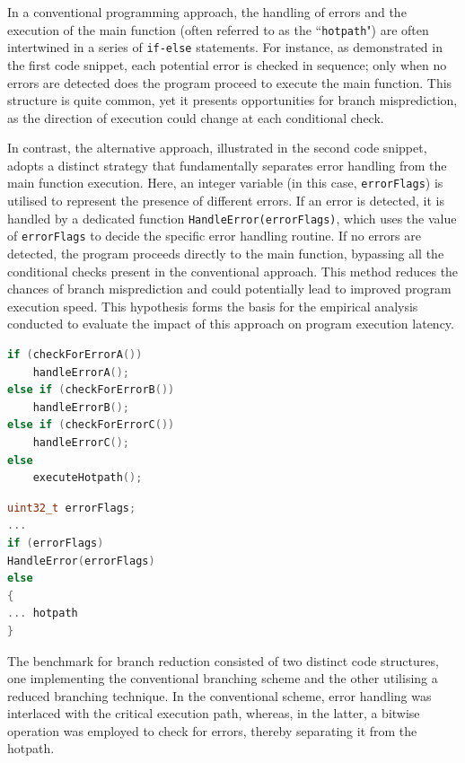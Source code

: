 \documentclass{article}
\theoremstyle{break}
\begin{document}
In a conventional programming approach, the handling of errors and the execution of the main function (often referred to as the ``\texttt{hotpath}") are often intertwined in a series of \texttt{if-else} statements. For instance, as demonstrated in the first code snippet, each potential error is checked in sequence; only when no errors are detected does the program proceed to execute the main function. This structure is quite common, yet it presents opportunities for branch misprediction, as the direction of execution could change at each conditional check.

In contrast, the alternative approach, illustrated in the second code snippet, adopts a distinct strategy that fundamentally separates error handling from the main function execution. Here, an integer variable (in this case, \texttt{errorFlags}) is utilised to represent the presence of different errors. If an error is detected, it is handled by a dedicated function \texttt{HandleError(errorFlags)}, which uses the value of \texttt{errorFlags} to decide the specific error handling routine. If no errors are detected, the program proceeds directly to the main function, bypassing all the conditional checks present in the conventional approach. This method reduces the chances of branch misprediction and could potentially lead to improved program execution speed. This hypothesis forms the basis for the empirical analysis conducted to evaluate the impact of this approach on program execution latency.



\begin{minipage}{.45\textwidth}
    \begin{lstlisting}[language=C++, title=Snippet 1: Bad design]
if (checkForErrorA())
    handleErrorA();
else if (checkForErrorB())
    handleErrorB();
else if (checkForErrorC())
    handleErrorC();
else
    executeHotpath();
    \end{lstlisting}
  \end{minipage}\hfill%
  \begin{minipage}{.45\textwidth}
    \begin{lstlisting}[language=C++, title=Snippet 2: Good design]
uint32_t errorFlags;
...
if (errorFlags)
HandleError(errorFlags)
else
{
... hotpath
}
\end{lstlisting}
\end{minipage}

The benchmark for branch reduction consisted of two distinct code structures, one implementing the conventional branching scheme and the other utilising a reduced branching technique. In the conventional scheme, error handling was interlaced with the critical execution path, whereas, in the latter, a bitwise operation was employed to check for errors, thereby separating it from the hotpath.
\end{document}
